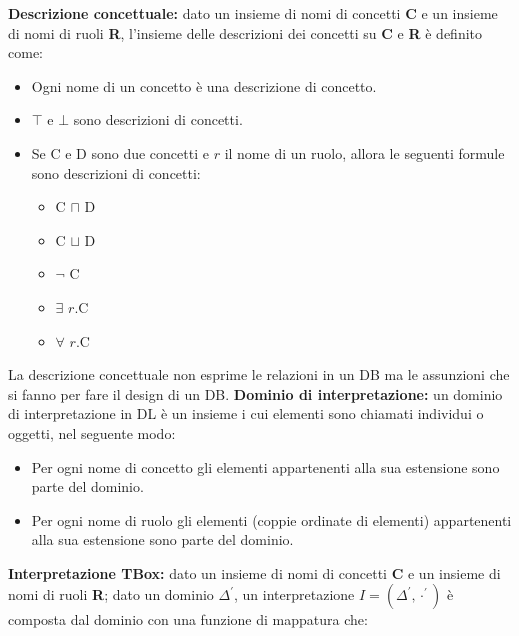 \documentclass[../main.tex]{subfiles}
\newcommand{\spazio}{\vspace{2em} \newline}
\begin{document}
   \textbf{Descrizione concettuale:} dato un insieme di nomi di concetti \textbf{C} e un insieme di nomi di ruoli \textbf{R}, l'insieme delle descrizioni dei concetti su \textbf{C} e \textbf{R} è definito come:
   \begin{itemize}
      \item Ogni nome di un concetto è una descrizione di concetto.
      \item $\top$ e $\bot$ sono descrizioni di concetti.
      \item Se C e D sono due concetti e $r$ il nome di un ruolo, allora le seguenti formule sono descrizioni di concetti:
      \begin{itemize}
         \item C $\sqcap$ D
         \item C $\sqcup$ D
         \item $\lnot$ C
         \item $\exists$ $r$.C
         \item $\forall$ $r$.C
      \end{itemize} 
   \end{itemize}
   La descrizione concettuale non esprime le relazioni in un DB ma le assunzioni che si fanno per fare il design di un DB.
   \spazio
   \textbf{Dominio di interpretazione:} un dominio di interpretazione in DL è un insieme i cui elementi sono chiamati individui o oggetti, nel seguente modo:
   \begin{itemize}
      \item Per ogni nome di concetto gli elementi appartenenti alla sua estensione sono parte del dominio.
      \item Per ogni nome di ruolo gli elementi (coppie ordinate di elementi) appartenenti alla sua estensione sono parte del dominio.
   \end{itemize}
   \vspace{2em}
   \textbf{Interpretazione TBox:} dato un insieme di nomi di concetti \textbf{C} e un insieme di nomi di ruoli \textbf{R}; dato un dominio $\Delta ^\prime$, un interpretazione $I=(\Delta^\prime, \cdot^\prime)$ è composta dal dominio con una funzione di mappatura che:
\end{document}
